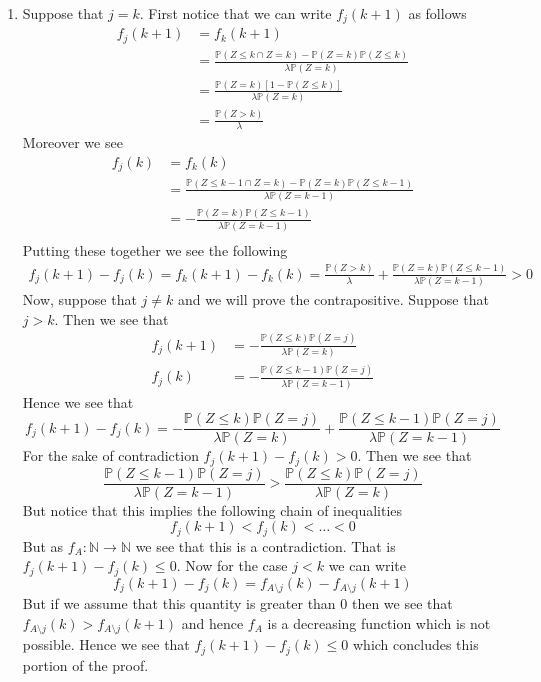 \documentclass[12pt]{article}  %
\newcommand{\N}{{\mathbb{N}}}
\newcommand{\prob}{{\mathbb{P}}}
\begin{document}
\begin{enumerate}
\begin{enumerate}
\item Suppose that $j = k$. First notice that we can write $f_j(k+1)$ as follows
\begin{align*}
f_{j}(k+1) &= f_k(k+1)\\
&= \frac{\prob(Z\leq k\cap Z = k)-\prob(Z=k)\prob(Z\leq k)}{\lambda\prob(Z=k)} \\
&= \frac{\prob(Z = k)\left[1-\prob(Z\leq k)\right]}{\lambda\prob(Z=k)}\\
&= \frac{\prob(Z>k)}{\lambda}
\end{align*}
Moreover we see 
\begin{align*}
f_{j}(k) &= f_k(k)\\
&= \frac{\prob(Z\leq k-1\cap Z = k)-\prob(Z=k)\prob(Z\leq k-1)}{\lambda\prob(Z=k-1)} \\
&= -\frac{\prob(Z = k)\prob(Z\leq k-1)}{\lambda\prob(Z=k-1)}\\
\end{align*}
Putting these together we see the following 
\begin{align*}
f_{j}(k+1)-f_j(k) = f_{k}(k+1)-f_k(k) = \frac{\prob(Z>k)}{\lambda} + \frac{\prob(Z = k)\prob(Z\leq k-1)}{\lambda\prob(Z=k-1)} > 0 
\end{align*}
Now, suppose that $j\neq k$ and we will prove the contrapositive. Suppose that $j>k$. Then we see that 
\begin{align*}
f_j(k+1) &= -\frac{\prob(Z\leq k)\prob(Z=j)}{\lambda\prob(Z = k)}\\
f_j(k) &= -\frac{\prob(Z\leq k-1)\prob(Z=j)}{\lambda\prob(Z = k-1)}
\end{align*}
Hence we see that 
$$f_j(k+1)- f_j(k)= -\frac{\prob(Z\leq k)\prob(Z=j)}{\lambda\prob(Z = k)} + \frac{\prob(Z\leq k-1)\prob(Z=j)}{\lambda\prob(Z = k-1)}$$ For the sake of contradiction $f_j(k+1)- f_j(k)>0$. Then we see that  $$\frac{\prob(Z\leq k-1)\prob(Z=j)}{\lambda\prob(Z = k-1)}>\frac{\prob(Z\leq k)\prob(Z=j)}{\lambda\prob(Z = k)} $$ But notice that this implies the following chain of inequalities $$f_j(k+1)<f_j(k)<\ldots < 0$$ But as $f_A:\N\to\N$ we see that this is a contradiction. That is $f_j(k+1)- f_j(k)\leq0$. Now for the case $j<k$ we can write $$f_{j}(k+1) - f_j(k) = f_{A\setminus j}(k) - f_{A\setminus j}(k+1)$$ But if we assume that this quantity is greater than $0$ then we see that $f_{A\setminus j}(k) > f_{A\setminus j}(k+1)$ and hence $f_A$ is a decreasing function which is not possible. Hence we see that $f_{j}(k+1) - f_j(k) \leq 0$ which concludes this portion of the proof. 


\end{enumerate}
\end{enumerate}
\end{document}
